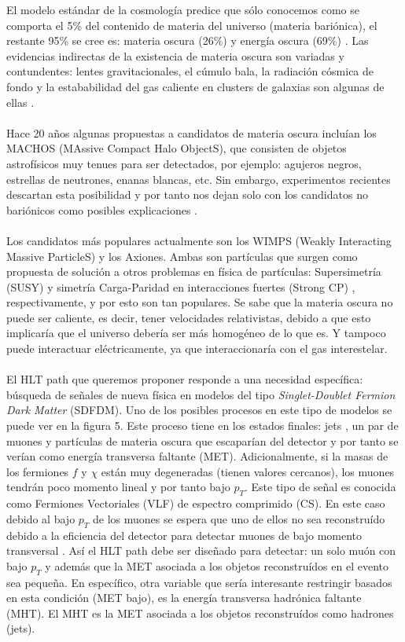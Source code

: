 El modelo estándar de la cosmología predice que sólo conocemos como se comporta el 5\% del contenido de materia del universo (materia bariónica), el restante 95\% se cree es: materia oscura (26\%) y energía oscura (69\%) \cite{Ade:2015xua}. Las evidencias indirectas de la existencia de materia oscura son variadas y contundentes: lentes gravitacionales, el cúmulo bala, la radiación cósmica de fondo y la estababilidad del gas caliente en clusters de galaxias son algunas de ellas \cite{Freese:2017idy}. 
\\
\\
Hace 20 años algunas propuestas a candidatos de materia oscura incluían los MACHOS (MAssive Compact Halo ObjectS), que consisten de objetos astrofísicos muy tenues para ser detectados, por ejemplo: agujeros negros, estrellas de neutrones, enanas blancas, etc. Sin embargo, experimentos recientes descartan esta posibilidad y por tanto nos dejan solo con los candidatos no bariónicos como posibles explicaciones \cite{Freese:1999ge,Fields:1999ar}.
\\
\\
Los candidatos más populares actualmente son los WIMPS (Weakly Interacting Massive ParticleS) y los Axiones. Ambas son partículas que surgen como propuesta de solución a otros problemas en física de partículas: Supersimetría (SUSY) \cite{SUSY} y simetría Carga-Paridad en interacciones fuertes (Strong CP) \cite{StrongCP}, respectivamente, y por esto son tan populares. Se sabe que la materia oscura no puede ser caliente, es decir, tener velocidades relativistas, debido a que esto implicaría que el universo debería ser más homogéneo de lo que es. Y tampoco puede interactuar eléctricamente, ya que interaccionaría con el gas interestelar. 
\\
\\
El HLT path que queremos proponer responde a una necesidad específica: búsqueda de señales de nueva física en modelos del tipo \textit{Singlet-Doublet Fermion Dark Matter} (SDFDM)\cite{1475-7516-2016-03-048}. Uno de los posibles procesos en este tipo de modelos se puede ver en la figura 5. Este proceso tiene en los estados finales: jets , un par de muones y partículas de materia oscura que escaparían del detector y por tanto se verían como energía transversa faltante (MET). Adicionalmente, si la masas de los fermiones $f$ y $\chi$ están muy degeneradas (tienen valores cercanos), los muones tendrán poco momento lineal y por tanto bajo $p_T$. Este tipo de señal es conocida como Fermiones Vectoriales (VLF) de espectro comprimido (CS). En este caso debido al bajo $p_T$ de los muones se espera que uno de ellos no sea reconstruído debido a la eficiencia del detector para detectar muones de bajo momento transversal \cite{Chatrchyan:2012xi}. Así el HLT path debe ser diseñado para detectar: un solo muón con bajo $p_T$ y además que la MET asociada a los objetos reconstruídos en el evento sea pequeña. En específico, otra variable que sería interesante restringir basados en esta condición (MET bajo), es la energía transversa hadrónica faltante (MHT). El MHT es la MET asociada a los objetos reconstruídos como hadrones (jets).
